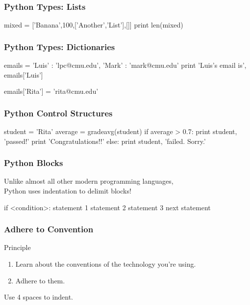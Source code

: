\begin{frame}[fragile]
\frametitle{Python Types: Lists}

\begin{python}
mixed = ['Banana',100,['Another','List'],[]]
print len(mixed)
\end{python}

\end{frame}

\begin{frame}[fragile]
\frametitle{Python Types: Dictionaries}
\begin{python}
emails = { 'Luis' : 'lpc@cmu.edu',
           'Mark' : 'mark@cmu.edu' }
print 'Luis's email is', emails['Luis']

emails['Rita'] = 'rita@cmu.edu'
\end{python}

\end{frame}

\begin{frame}[fragile]
\frametitle{Python Control Structures}

\begin{python}
student = 'Rita'
average = gradeavg(student)
if average > 0.7:
    print student, 'passed!'
    print 'Congratulations!!'
else:
    print student, 'failed. Sorry.'
\end{python}
\end{frame}

\begin{frame}[fragile]
\frametitle{Python Blocks}

Unlike almost all other modern programming languages,\\
Python uses \alert{indentation} to delimit blocks!

\begin{python}
if <condition>:
    statement 1
    statement 2
    statement 3
next statement
\end{python}

\end{frame}

\begin{frame}[fragile]
\frametitle{Adhere to Convention}
\begin{block}{Principle}
\begin{enumerate}
\item Learn about the conventions of the technology you're using.
\item Adhere to them.
\end{enumerate}
\end{block}

Use 4 spaces to indent.
\end{frame}

